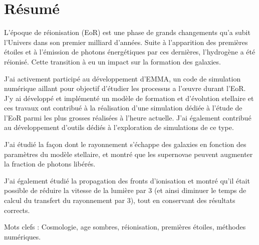 \begingroup
\let\clearpage\relax
\let\cleardoublepage\relax
\let\cleardoublepage\relax

\chapter*{Résumé}
L’époque de réionisation (EoR) est une phase de grands changements qu’a subit l’Univers dans son premier milliard d’années. 
Suite à l’apparition des premières étoiles et à l’émission de photons énergétiques par ces dernières, l’hydrogène a été réionisé. 
Cette transition à eu un impact sur la formation des galaxies. 

J’ai activement participé au développement d’EMMA, un code de simulation numérique aillant pour objectif d’étudier les processus a l’œuvre durant l’EoR. 
J’y ai développé et implémenté un modèle de formation et d’évolution stellaire et ces travaux ont contribué à la réalisation d’une simulation dédiée à l’étude de l’EoR parmi les plus grosses réalisées à l’heure actuelle. 
J’ai également contribué au développement d’outils dédiés à l’exploration de simulations de ce type.

J’ai étudié la façon dont le rayonnement s’échappe des galaxies en fonction des paramètres du modèle stellaire, et montré que les supernovae peuvent augmenter la fraction de photons libérés.

J’ai également étudié la propagation des fronts d’ionisation et montré qu’il était possible de réduire la vitesse de la lumière par 3 (et ainsi diminuer le temps de calcul du transfert du rayonnement par 3), tout en conservant des résultats corrects.

\vspace{0.5cm}

Mots clefs : Cosmologie, age sombres, réionisation, premières étoiles, méthodes numériques.
\vfill

\newpage

